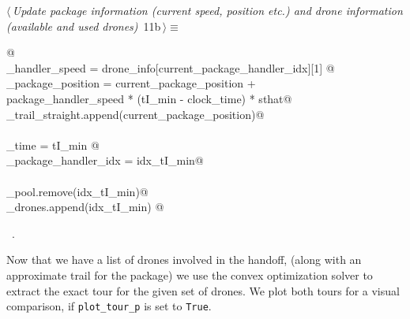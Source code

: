 \documentclass[10pt, english, oneside]{report}
\begin{document}
\begin{flushleft} \small
\begin{minipage}{\linewidth}\label{scrap9}\raggedright\small
{} $\langle\,${\itshape Update package information (current speed, position etc.) and drone information (available and used drones)}\nobreak\ {\footnotesize {11b}}$\,\rangle\equiv$
\vspace{-1ex}
\begin{list}{}{} \item
\mbox{}\verb@   @\\
\mbox{}\verb@package_handler_speed    = drone_info[current_package_handler_idx][1] @\\
\mbox{}\verb@current_package_position = current_package_position + \@\\
\mbox{}\verb@                            package_handler_speed * (tI_min - clock_time) *  sthat@\\
\mbox{}\verb@package_trail_straight.append(current_package_position)@\\
\mbox{}\verb@@\\
\mbox{}\verb@clock_time                  = tI_min @\\
\mbox{}\verb@current_package_handler_idx = idx_tI_min@\\
\mbox{}\verb@@\\
\mbox{}\verb@drone_pool.remove(idx_tI_min)@\\
\mbox{}\verb@used_drones.append(idx_tI_min)  @\\
\mbox{}\verb@@{\NWsep}
\end{list}
\vspace{-1.5ex}
\footnotesize
\begin{list}{}{\setlength{\itemsep}{-\parsep}\setlength{\itemindent}{-\leftmargin}}
\item \NWtxtMacroRefIn\ .

\item{}
\end{list}
\end{minipage}\vspace{4ex}
\end{flushleft}


Now that we have a list of drones involved in the handoff, (along with an approximate trail for the package) 
we use the convex optimization solver to extract the exact tour for the given set of drones. We plot both tours
for a visual comparison, if \verb|plot_tour_p| is set to \verb|True|.
\end{document}
